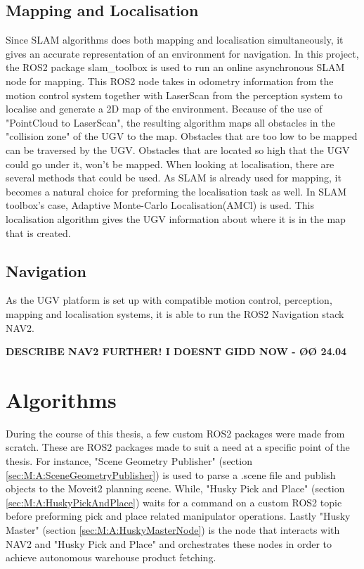 \subsection{Mapping and Localisation} \label{sec:M:AN:MappingAndLocalization}
 Since SLAM algorithms does both mapping and localisation simultaneously, it gives an accurate representation of an environment for navigation. In this project, the ROS2 package slam\_toolbox is used to run an online asynchronous SLAM node for mapping. This ROS2 node takes in odometry information from the motion control system together with LaserScan from the perception system to localise and generate a 2D map of the environment. Because of the use of "PointCloud to LaserScan", the resulting algorithm maps all obstacles in the "collision zone" of the UGV to the map. Obstacles that are too low to be mapped can be traversed by the UGV. Obstacles that are located so high that the UGV could go under it, won't be mapped. When looking at localisation, there are several methods that could be used. As SLAM is already used for mapping, it becomes a natural choice for preforming the localisation task as well. In SLAM toolbox's case, Adaptive Monte-Carlo Localisation(AMCl) is used. This localisation algorithm gives the UGV information about where it is in the map that is created. 

\subsection{Navigation}
As the UGV platform is set up with compatible motion control, perception, mapping and localisation systems, it is able to run the ROS2 Navigation stack NAV2. 

\textbf{DESCRIBE NAV2 FURTHER! I DOESNT GIDD NOW - ØØ 24.04}


\section{Algorithms}
During the course of this thesis, a few custom ROS2 packages were made from scratch. These are ROS2 packages made to suit a need at a specific point of the thesis. For instance, "Scene Geometry Publisher" (section \ref{sec:M:A:SceneGeometryPublisher}) is used to parse a .scene file and publish objects to the Moveit2 planning scene. While, "Husky Pick and Place" (section \ref{sec:M:A:HuskyPickAndPlace}) waits for a command on a custom ROS2 topic before preforming pick and place related manipulator operations. Lastly "Husky Master" (section \ref{sec:M:A:HuskyMasterNode}) is the node that interacts with NAV2 and "Husky Pick and Place" and orchestrates these nodes in order to achieve autonomous warehouse product fetching.

